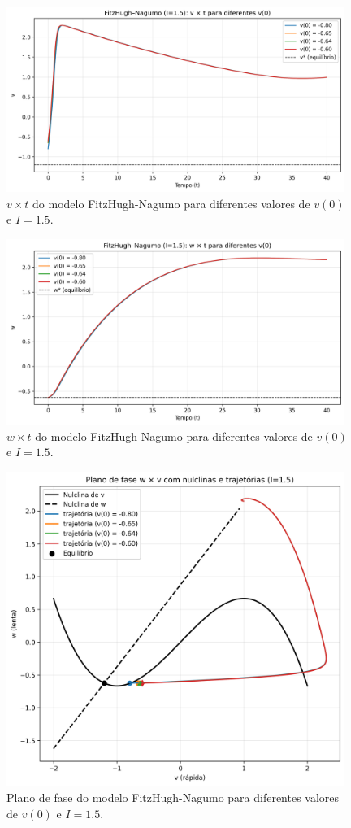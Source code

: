 \documentclass[english,11pt,a4paper]{article}
\begin{document}
	\begin{figure}[H]
		\centering
		\includegraphics[width=11cm]{../figures/ex_1j_I1.5_1.png}
		\caption{$v \times t$ do modelo FitzHugh-Nagumo para diferentes valores de $v(0)$ e $I = 1.5$.}
	\end{figure}
	
	\begin{figure}[H]
		\centering
		\includegraphics[width=11cm]{../figures/ex_1j_I1.5_2.png}
		\caption{$w \times t$ do modelo FitzHugh-Nagumo para diferentes valores de $v(0)$ e $I = 1.5$.}
	\end{figure}
	
	\begin{figure}[H]
		\centering
		\includegraphics[width=11cm]{../figures/ex_1j_I1.5_3.png}
		\caption{Plano de fase do modelo FitzHugh-Nagumo para diferentes valores de $v(0)$ e $I = 1.5$.}
	\end{figure}
	
\end{document}
